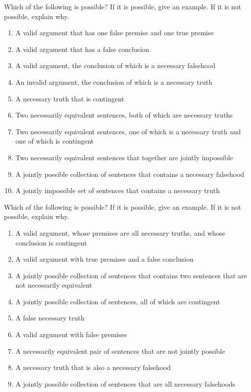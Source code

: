 \problempart
\label{pr.EnglishCombinations2}
Which of the following is possible? If it is possible, give an example. If it is not possible, explain why.
\begin{enumerate}
\item A valid argument that has one false premise and one true premise

\item A valid argument that has a false conclusion

\item A valid argument, the conclusion of which is a necessary falsehood

\item An invalid argument, the conclusion of which is a necessary truth

\item A necessary truth that is contingent

\item Two necessarily equivalent sentences, both of which are necessary truths

\item Two necessarily equivalent sentences, one of which is a necessary truth and one of which is contingent

\item Two necessarily equivalent sentences that together are jointly impossible

\item A jointly possible collection of sentences that contains a necessary falsehood

\item A jointly impossible set of sentences that contains a necessary truth
\end{enumerate}

\problempart
Which of the following is possible? If it is possible, give an example. If it is not possible, explain why.

\begin{enumerate}
\item A valid argument, whose premises are all necessary truths, and whose conclusion is contingent
\item A valid argument with true premises and a false conclusion
\item A jointly possible collection of sentences that contains two sentences that are not necessarily equivalent
\item A jointly possible collection of sentences, all of which are contingent
\item A false necessary truth
\item A valid argument with false premises
\item A necessarily equivalent pair of sentences that are not jointly possible
\item A necessary truth that is also a necessary falsehood
\item A jointly possible collection of sentences that are all necessary falsehoods
\end{enumerate}

